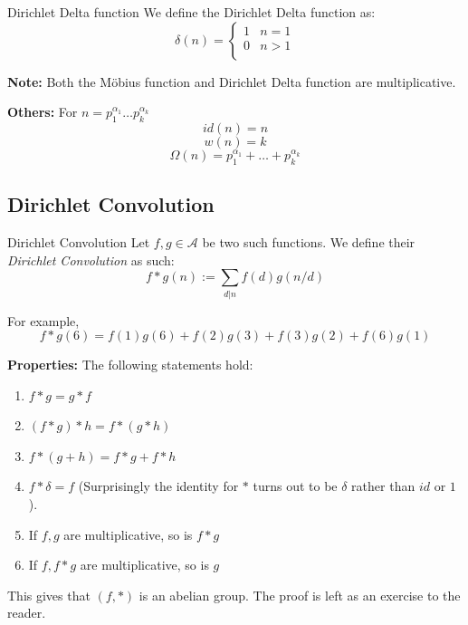 \documentclass[a4paper,11pt,abstracton]{scrartcl}
\theoremstyle{dotlessP}
\theoremstyle{dotlessS}
\theoremstyle{remark}
\theoremstyle{definition}
\begin{document}
\begin{mainbox}{Dirichlet Delta function}
We define the Dirichlet Delta function as:
\begin{equation}
\delta(n)=
    \begin{cases}
        1 &  n=1\\
        0 &  n>1\\
    \end{cases}
\end{equation}
\end{mainbox}

\textbf{Note:} Both the Möbius function and Dirichlet Delta function are multiplicative.

\begin{definition_box}
\textbf{Others:}
For $n=p_1^{\alpha_1} \dots p_k^{\alpha_k}$
\begin{equation}
id(n) = n
\end{equation}
\begin{equation}
w(n) = k
\end{equation}
\begin{equation}
\Omega(n) = p_1^{\alpha_1} + \dots + p_k^{\alpha_k}
\end{equation}
\end{definition_box}

\subsection{Dirichlet Convolution}

\begin{mainbox}{Dirichlet Convolution}
Let $f, g \in \mathcal{A}$ be two such functions. We define their \textit{Dirichlet Convolution} as such:
$$f*g(n) := \sum_{d|n} f(d)g(n/d)$$
\end{mainbox}

\begin{example_box}
For example, 
$$f*g(6) = f(1)g(6) + f(2)g(3) + f(3)g(2) + f(6)g(1)$$
\end{example_box}

\begin{claim_box}
\textbf{Properties:} The following statements hold: 
\begin{enumerate}
\item $f*g = g*f$
\item $(f*g)*h = f*(g*h)$
\item $f*(g+h)=f*g+f*h$
\item $f*\delta = f$ (Surprisingly the identity for $*$ turns out to be $\delta$ rather than $id$ or $1$).
\item If $f,g$ are multiplicative, so is $f*g$
\item If $f, f*g$ are multiplicative, so is $g$
\end{enumerate}
This gives that $(f, *)$ is an abelian group.
The proof is left as an exercise to the reader.
\end{claim_box}
\end{document}
